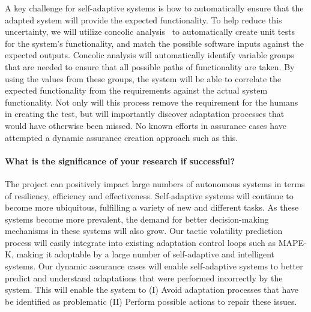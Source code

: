 \documentclass[12pt]{article}
\newcommand{\todo}[1]{\textcolor{cyan}{\textbf{[#1]}}}
\begin{document}
A key challenge for self-adaptive systems is how to automatically ensure that the adapted system will provide the expected functionality. To help reduce this uncertainty, we will utilize concolic analysis~\cite{Sen:2005:CCU:1081706.1081750} to automatically create unit tests for the system's functionality, and match the possible software inputs against the expected outputs. Concolic analysis will automatically identify variable groups that are needed to ensure that all possible paths of functionality are taken. By using the values from these groups, the system will be able to correlate the expected functionality from the requirements against the actual system functionality. Not only will this process remove the requirement for the humans in creating the test, but will importantly discover adaptation processes that would have otherwise been missed. No known efforts in assurance cases have attempted a dynamic assurance creation approach such as this.





















\vspace{-5mm}\paragraph{What is the significance of your research if successful?} The project can positively impact large numbers of autonomous systems in terms of resiliency, efficiency and effectiveness. Self-adaptive systems will continue to become more ubiquitous, fulfilling a variety of new and different tasks. As these systems become more prevalent, the demand for better decision-making mechanisms in these systems will also grow. Our tactic volatility prediction process will easily integrate into existing adaptation control loops such as MAPE-K, making it adoptable by a large number of self-adaptive and intelligent systems. Our dynamic assurance cases will enable self-adaptive systems to better predict and understand adaptations that were performed incorrectly by the system. This will enable the system to (I) Avoid adaptation processes that have be identified as problematic (II) Perform possible actions to repair these issues.
\end{document}
